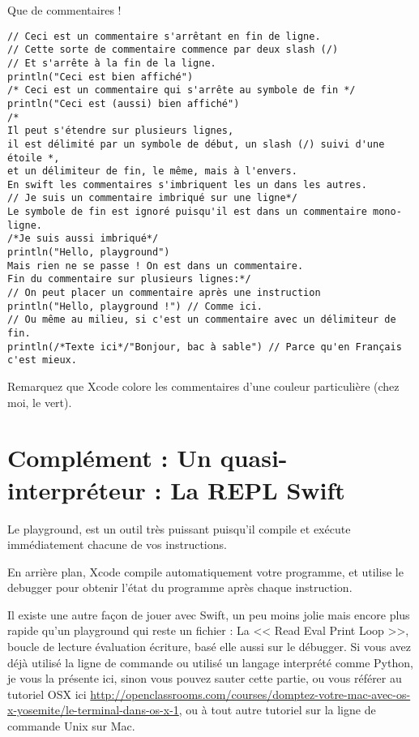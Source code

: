 \begin{listing}[H]
\caption{Que de commentaires !}
\begin{verbatim}
// Ceci est un commentaire s'arrêtant en fin de ligne.
// Cette sorte de commentaire commence par deux slash (/)
// Et s'arrête à la fin de la ligne.
println("Ceci est bien affiché")
/* Ceci est un commentaire qui s'arrête au symbole de fin */
println("Ceci est (aussi) bien affiché")
/*
Il peut s'étendre sur plusieurs lignes,
il est délimité par un symbole de début, un slash (/) suivi d'une étoile *,
et un délimiteur de fin, le même, mais à l'envers.
En swift les commentaires s'imbriquent les un dans les autres.
// Je suis un commentaire imbriqué sur une ligne*/
Le symbole de fin est ignoré puisqu'il est dans un commentaire mono-ligne.
/*Je suis aussi imbriqué*/
println("Hello, playground")
Mais rien ne se passe ! On est dans un commentaire.
Fin du commentaire sur plusieurs lignes:*/
// On peut placer un commentaire après une instruction
println("Hello, playground !") // Comme ici.
// Ou même au milieu, si c'est un commentaire avec un délimiteur de fin.
println(/*Texte ici*/"Bonjour, bac à sable") // Parce qu'en Français c'est mieux.
\end{verbatim}
\end{listing}
Remarquez que Xcode colore les commentaires d'une couleur particulière (chez moi, le vert).

\section{Complément : Un quasi-interpréteur : La REPL Swift}
Le playground, est un outil très puissant
puisqu’il compile et exécute immédiatement
chacune de vos instructions.

En arrière plan, Xcode compile automatiquement votre programme,
et utilise le debugger pour obtenir l’état du programme après chaque instruction.

Il existe une autre façon de jouer avec Swift,
un peu moins jolie mais encore plus rapide qu’un playground
qui reste un fichier :
La << Read Eval Print Loop >>, boucle de lecture évaluation écriture,
basé elle aussi sur le débugger.
Si vous avez déjà utilisé la ligne de commande
ou utilisé un langage interprété comme Python,
je vous la présente ici, sinon vous pouvez sauter cette partie,
ou vous référer au tutoriel OSX ici \url{http://openclassrooms.com/courses/domptez-votre-mac-avec-os-x-yosemite/le-terminal-dans-os-x-1},
ou à tout autre tutoriel sur la ligne de commande Unix sur Mac.

